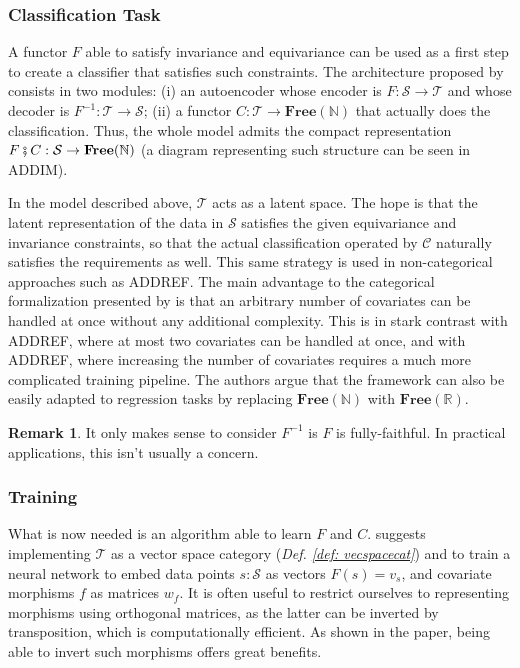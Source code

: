 \documentclass[12pt,a4paper,openright,twoside]{report}
\theoremstyle{plain}
\theoremstyle{definition}
\newtheorem{remark}[proposition]{Remark}
\begin{document}
\subsubsection{Classification Task}


A functor $F$ able to satisfy invariance and equivariance can be used as a first step to create a classifier that satisfies such constraints. The architecture proposed by \cite{chytas2024poolingimagedatasetsmultiple} consists in two modules: (i) an autoencoder whose encoder is $F: \mathcal{S} \to \mathcal{T}$ and whose decoder is $F^{-1}: \mathcal{T} \to \mathcal{S}$; (ii) a functor $C: \mathcal{T} \to \mathbf{Free}(\mathbb{N})$ that actually does the classification. Thus, the whole model admits the compact representation $F \fatsemi C: \mathcal{S} \to \mathbf{Free}(\mathbb{N})$ (a diagram representing such structure can be seen in ADDIM).


In the model described above, $\mathcal{T}$ acts as a latent space. The hope is that the latent representation of the data in $\mathcal{S}$ satisfies the given equivariance and invariance constraints, so that the actual classification operated by $\mathcal{C}$ naturally satisfies the requirements as well.
This same strategy is used in non-categorical approaches such as ADDREF. The main advantage to the categorical formalization presented by \cite{chytas2024poolingimagedatasetsmultiple} is that an arbitrary number of covariates can be handled at once without any additional complexity. This is in stark contrast with ADDREF, where at most two covariates can be handled at once, and with ADDREF, where increasing the number of covariates requires a much more complicated training pipeline. The authors argue that the framework can also be easily adapted to regression tasks by replacing $\mathbf{Free}(\mathbb{N})$ with $\mathbf{Free}(\mathbb{R})$.

\begin{remark}
  It only makes sense to consider $F^{-1}$ is $F$ is fully-faithful. In practical applications, this isn't usually a concern.
\end{remark}


\subsubsection{Training}

What is now needed is an algorithm able to learn $F$ and $C$. \cite{chytas2024poolingimagedatasetsmultiple} suggests implementing $\mathcal{T}$ as a vector space category (\textit{Def. \ref{def: vecspacecat}}) and to train a neural network to embed data points $s : \mathcal{S}$ as vectors $F(s) = v_s$, and covariate morphisms $f$ as matrices $w_f$. It is often useful to restrict ourselves to representing morphisms using orthogonal matrices, as the latter can be inverted by transposition, which is computationally efficient. As shown in the paper, being able to invert such morphisms offers great benefits.
\end{document}
